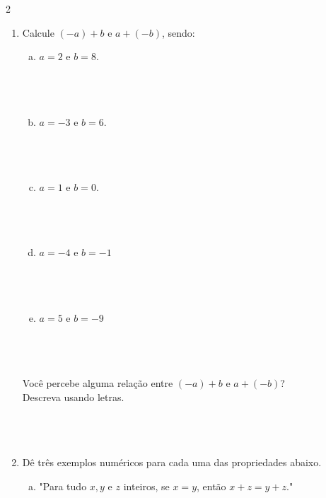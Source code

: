 \documentclass[a4paper,14pt]{article}
\begin{document}
\begin{multicols}{2}
\begin{enumerate}
\begin{enumerate}[a)]
    				\item $a = 0$ e $b = -17$. \\\\
    				\item $a = 6$ e $b = 2$. \\\\\\\\
    			\end{enumerate}
    			\item Calcule $(-a) + b$ e $a + (-b)$, sendo:
    			\begin{enumerate}[a)]
    				\item $a = 2$ e $b = 8$. \\\\\\\\
    				\item $a = -3$ e $b = 6$. \\\\\\\\
    				\item $a = 1$ e $b = 0$. \\\\\\\\
    				\item $a = -4$ e $b = -1$ \\\\\\\\
    				\item $a = 5$ e $b = -9$ \\\\\\\\    				
    			\end{enumerate}
    			Você percebe alguma relação entre $(-a) + b$ e $a +(-b)$? \\
    			Descreva usando letras. \\\\\\\\
    			\item Dê três exemplos numéricos para cada uma das propriedades abaixo.
    			\begin{enumerate}[a)]
    				\item "Para tudo $x, y$ e $z$ inteiros, se $x = y$, então $x + z = y + z$." \\\\\\\\

\end{enumerate}
\end{enumerate}
\end{multicols}
\end{document}
